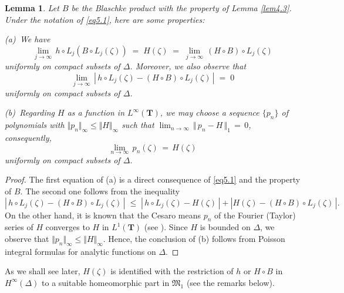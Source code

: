 \documentclass[12pt]{amsart}
\theoremstyle{plain}
\newtheorem{lem}{Lemma}[section]
\numberwithin{equation}{section}
\begin{document}
\begin{lem}
\label{lem5.1}
Let $B$ be the Blaschke product with the property of Lemma \ref{lem4.3}.
Under the notation of \eqref{eq5.1}, here are some properties:

{\rm (a)} \,We have
\begin{equation*}
\lim_{j\to\infty}\, h\circ L_j(B\circ L_j(\zeta))
\;=\;
H(\zeta)
\;=\;
\lim_{j\to\infty}\, (H\circ B)\circ L_j(\zeta)
\end{equation*}
uniformly on compact subsets of $\Delta$. Moreover, we also observe that
\begin{equation*}
\lim_{j\to\infty}\, \left\vert \,h\circ L_j(\zeta) -
(H\circ B)\circ L_j(\zeta)\, \right\vert
\;=\;0
\end{equation*}
uniformly on compact subsets of $\Delta$.

\medskip
{\rm (b)} \,Regarding $H$ as a function in $L^\infty(\mathbf{T})$,
we may choose a sequence $\{p_n\}$ of polynomials with \;
$\Vert p_n \Vert_\infty \leq \Vert H \Vert_\infty$ such that
$\lim_{n\to\infty}\, \Vert \, p_n - H \,\Vert_1 \,=\, 0$,
consequently,
\begin{equation*}
\lim_{n\to\infty}\, p_n(\zeta)\,=\,H(\zeta)
\end{equation*}
uniformly on compact subsets of $\Delta$.
\end{lem}

\begin{proof}
The first equation of (a) is a direct consequence of \eqref{eq5.1} and the
property of $B$. The second one follows from the inequality
\begin{equation*}
\left\vert \,h\circ L_j(\zeta) -
(H\circ B)\circ L_j(\zeta)\, \right\vert
\; \leq \;
 \left\vert \,h\circ L_j(\zeta) - H(\zeta)\, \right\vert +
 \left\vert H(\zeta) - (H\circ B)\circ L_j(\zeta)\,\right\vert.
\end{equation*}
On the other hand, it is known that the Cesaro means $p_n$ of the
Fourier (Taylor) series of $H$ converges to $H$ in
$L^1(\mathbf{T})$ (see \cite[16p]{H}). Since $H$ is bounded on $\Delta$,
we observe that
$\Vert p_n \Vert_\infty \leq \Vert H \Vert_\infty$. Hence, the
conclusion of (b) follows from Poisson integral formulas for
analytic functions on $\Delta$.
\end{proof}

\medskip
As we shall see later, $H(\zeta)$ is identified with the
restriction of $h$ or $H\circ B$ in $H^\infty(\Delta)$
to a suitable homeomorphic part in $\mathfrak{M}_1$
(see the remarks below).
\end{document}
